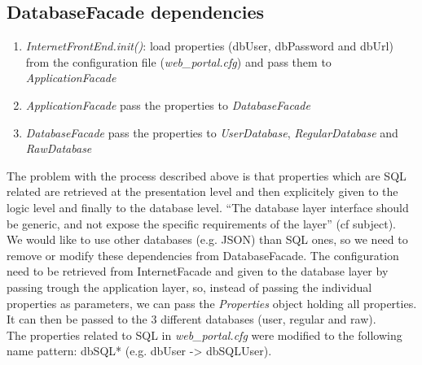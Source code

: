 \subsection{DatabaseFacade dependencies}

\begin{enumerate}
\item \emph{InternetFrontEnd.init()}: load properties (dbUser, dbPassword and
    dbUrl) from the configuration file (\emph{web\_portal.cfg}) and pass them to
    \emph{ApplicationFacade}
    
\item \emph{ApplicationFacade} pass the properties to \emph{DatabaseFacade}

\item \emph{DatabaseFacade} pass the properties to \emph{UserDatabase},
    \emph{RegularDatabase} and \emph{RawDatabase}
\end{enumerate}

The problem with the process described above is that properties which are SQL
related are retrieved at the presentation level and then explicitely given to
the logic level and finally to the database level. ``The database layer
interface should be generic, and not expose the specific requirements of the
layer'' (cf subject).\\

We would like to use other databases (e.g. JSON) than SQL ones, so we need to
remove or modify these dependencies from DatabaseFacade. The configuration need
to be retrieved from InternetFacade and given to the database layer by passing
trough the application layer, so, instead of passing the individual properties
as parameters, we can pass the \emph{Properties} object holding all properties.
It can then be passed to the 3 different databases (user, regular and raw).\\

The properties related to SQL in \emph{web\_portal.cfg} were modified to the
following name pattern: dbSQL* (e.g. dbUser -> dbSQLUser).
\newpage

